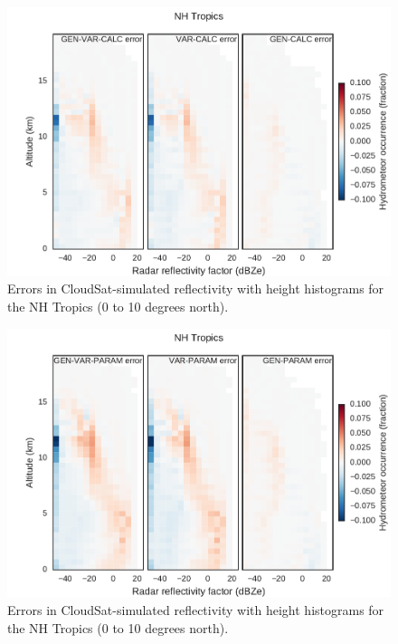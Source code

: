 \begin{figure}[htbp]
\centering
\includegraphics{graphics/subgrid2_cfadDbze94_NHTropics_gen-var-calc_diff.pdf}
\caption{\label{fig:subgrid2_cfadDbze94_nhtropics_diff}Errors in
CloudSat-simulated reflectivity with height histograms for the NH
Tropics (0 to 10 degrees
north).}\label{fig:subgrid2ux5fcfadDbze94ux5fnhtropicsux5fdiff}
\end{figure}

\begin{figure}[htbp]
\centering
\includegraphics{graphics/subgrid2_cfadDbze94_NHTropics_gen-var-param_diff.pdf}
\caption{\label{fig:subgrid2_cfadDbze94_nhtropics_gen-var-param_diff}Errors
in CloudSat-simulated reflectivity with height histograms for the NH
Tropics (0 to 10 degrees
north).}\label{fig:subgrid2ux5fcfadDbze94ux5fnhtropicsux5fgen-var-paramux5fdiff}
\end{figure}

